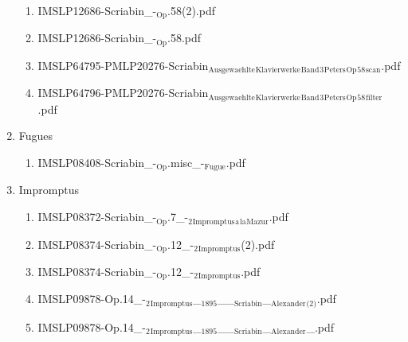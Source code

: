 \documentclass[11pt]{article}
\begin{document}
\begin{enumerate}
\begin{enumerate}
\item IMSLP12686-Scriabin\_-$_{\text{Op}}$.58(2).pdf
\label{sec-1-1-1-1-44-63-3-4}

\item IMSLP12686-Scriabin\_-$_{\text{Op}}$.58.pdf
\label{sec-1-1-1-1-44-63-3-5}

\item IMSLP64795-PMLP20276-Scriabin$_{\text{Ausgewaehlte}}$$_{\text{Klavierwerke}}$$_{\text{Band}}$$_{\text{3}}$$_{\text{Peters}}$$_{\text{Op}}$$_{\text{58}}$$_{\text{scan}}$.pdf
\label{sec-1-1-1-1-44-63-3-6}

\item IMSLP64796-PMLP20276-Scriabin$_{\text{Ausgewaehlte}}$$_{\text{Klavierwerke}}$$_{\text{Band}}$$_{\text{3}}$$_{\text{Peters}}$$_{\text{Op}}$$_{\text{58}}$$_{\text{filter}}$.pdf
\label{sec-1-1-1-1-44-63-3-7}
\end{enumerate}

\item Fugues
\label{sec-1-1-1-1-44-63-4}
\begin{enumerate}
\item IMSLP08408-Scriabin\_-$_{\text{Op}}$.misc\_-$_{\text{Fugue}}$.pdf
\label{sec-1-1-1-1-44-63-4-1}
\end{enumerate}

\item Impromptus
\label{sec-1-1-1-1-44-63-5}
\begin{enumerate}
\item IMSLP08372-Scriabin\_-$_{\text{Op}}$.7\_-$_{\text{2}}$$_{\text{Impromptus}}$$_{\text{a}}$$_{\text{la}}$$_{\text{Mazur}}$.pdf
\label{sec-1-1-1-1-44-63-5-1}

\item IMSLP08374-Scriabin\_-$_{\text{Op}}$.12\_-$_{\text{2}}$$_{\text{Impromptus}}$(2).pdf
\label{sec-1-1-1-1-44-63-5-2}

\item IMSLP08374-Scriabin\_-$_{\text{Op}}$.12\_-$_{\text{2}}$$_{\text{Impromptus}}$.pdf
\label{sec-1-1-1-1-44-63-5-3}

\item IMSLP09878-Op.14\_-$_{\text{2}}$$_{\text{Impromptus}}$\_$_{\text{1895}}$\_\_$_{\text{Scriabin}}$\_$_{\text{Alexander}}$$_{\text{(2)}}$.pdf
\label{sec-1-1-1-1-44-63-5-4}

\item IMSLP09878-Op.14\_-$_{\text{2}}$$_{\text{Impromptus}}$\_$_{\text{1895}}$\_\_$_{\text{Scriabin}}$\_$_{\text{Alexander}}$\_.pdf
\label{sec-1-1-1-1-44-63-5-5}


\end{enumerate}
\end{enumerate}
\end{document}

